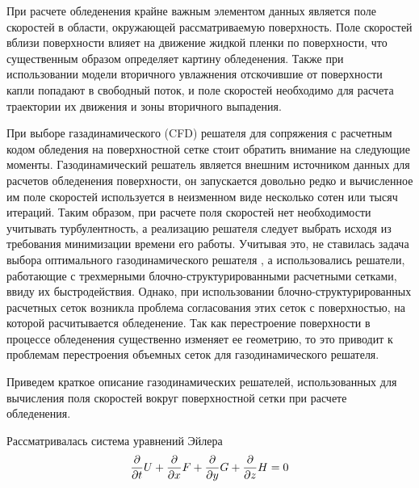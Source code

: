 При расчете обледенения крайне важным элементом данных является поле скоростей в области, окружающей рассматриваемую поверхность.
Поле скоростей вблизи поверхности влияет на движение жидкой пленки по поверхности, что существенным образом определяет картину обледенения.
Также при использовании модели вторичного увлажнения отскочившие от поверхности капли попадают в свободный поток, и поле скоростей необходимо для расчета траектории их движения и зоны вторичного выпадения.

При выборе газадинамического (CFD\label{abbr:cfd}) решателя для сопряжения с расчетным кодом обледения на поверхностной сетке стоит обратить внимание на следующие моменты.
Газодинамический решатель является внешним источником данных для расчетов обледенения поверхности, он запускается довольно редко и вычисленное им поле скоростей используется в неизменном виде несколько сотен или тысяч итераций.
Таким образом, при расчете поля скоростей нет необходимости учитывать турбулентность, а реализацию решателя следует выбрать исходя из требования минимизации времени его работы.
Учитывая это, не ставилась задача выбора оптимального газодинамического решателя \cite{Blazek2015CFD}, а использовались решатели, работающие с трехмерными блочно-структурированными расчетными сетками, ввиду их быстродействия.
Однако, при использовании блочно-структурированных расчетных сеток возникла проблема согласования этих сеток с поверхностью, на которой расчитывается обледенение.
Так как перестроение поверхности в процессе обледенения существенно изменяет ее геометрию, то это приводит к проблемам перестроения объемных сеток для газодинамического решателя.

Приведем краткое описание газодинамических решателей, использованных для вычисления поля скоростей вокруг поверхностной сетки при расчете обледенения.

Рассматривалась система уравнений Эйлера \cite{Kulikovsky2001Gas}
\begin{equation}\label{eqn:text_1_gas_system}
	\frac{\partial}{\partial t} U + \frac{\partial}{\partial x} F + \frac{\partial}{\partial y} G + \frac{\partial}{\partial z} H = 0 \\
\end{equation}

